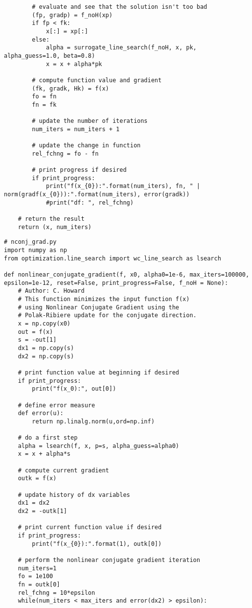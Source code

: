 {\begin{verbatim}
        # evaluate and see that the solution isn't too bad
        (fp, gradp) = f_noH(xp)
        if fp < fk:
            x[:] = xp[:]
        else:
            alpha = surrogate_line_search(f_noH, x, pk, alpha_guess=1.0, beta=0.8)
            x = x + alpha*pk

        # compute function value and gradient
        (fk, gradk, Hk) = f(x)
        fo = fn
        fn = fk

        # update the number of iterations
        num_iters = num_iters + 1

        # update the change in function
        rel_fchng = fo - fn

        # print progress if desired
        if print_progress:
            print("f(x_{0}):".format(num_iters), fn, " | norm(gradf(x_{0})):".format(num_iters), error(gradk))
            #print("df: ", rel_fchng)
    
    # return the result
    return (x, num_iters)
\end{verbatim}

\begin{verbatim}
# nconj_grad.py
import numpy as np
from optimization.line_search import wc_line_search as lsearch

def nonlinear_conjugate_gradient(f, x0, alpha0=1e-6, max_iters=100000, epsilon=1e-12, reset=False, print_progress=False, f_noH = None):
    # Author: C. Howard
    # This function minimizes the input function f(x)
    # using Nonlinear Conjugate Gradient using the
    # Polak-Ribiere update for the conjugate direction.
    x = np.copy(x0)
    out = f(x)
    s = -out[1]
    dx1 = np.copy(s)
    dx2 = np.copy(s)

    # print function value at beginning if desired
    if print_progress:
        print("f(x_0):", out[0])

    # define error measure
    def error(u):
        return np.linalg.norm(u,ord=np.inf)

    # do a first step
    alpha = lsearch(f, x, p=s, alpha_guess=alpha0)
    x = x + alpha*s

    # compute current gradient
    outk = f(x)

    # update history of dx variables
    dx1 = dx2
    dx2 = -outk[1]

    # print current function value if desired
    if print_progress:
        print("f(x_{0}):".format(1), outk[0])

    # perform the nonlinear conjugate gradient iteration
    num_iters=1
    fo = 1e100
    fn = outk[0]
    rel_fchng = 10*epsilon
    while(num_iters < max_iters and error(dx2) > epsilon):


\end{verbatim}}
